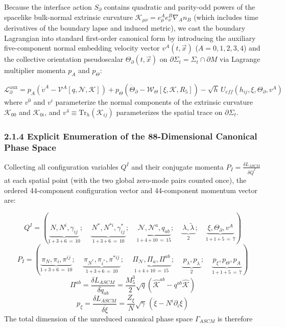 \documentclass[aps,prd,onecolumn,superscriptaddress,nofootinbib,longbibliography,10pt]{revtex4-2}
\begin{document}
{{  Because the interface action \(S_\partial\) contains quadratic and parity-odd powers of the spacelike bulk-normal extrinsic curvature \(\mathcal{K}_{\mu\nu} = e^A_\mu e^B_\nu \nabla_A n_B\) (which includes time derivatives of the boundary lapse and induced metric), we cast the boundary Lagrangian into standard first-order canonical form by introducing the auxiliary five-component normal embedding velocity vector \(v^A(t,\vec{x})\) (\(A = 0,1,2,3,4\)) and the collective orientation pseudoscalar \(\Theta_\partial(t,\vec{x})\) on \(\partial\Sigma_t = \Sigma_t \cap \partial M\) via Lagrange multiplier momenta \(p_A\) and \(p_\Theta\):


  \[ \mathcal{L}_\partial^{\text{aux}} = p_A\left(\dot{v}^A - \mathcal{V}^A[q,\mathcal{N},\mathcal{K}]\right) + p_\Theta\left(\dot{\Theta}_\partial - \mathcal{W}_\Theta[\xi,\mathcal{K},R_5]\right) - \sqrt{h}\,U_{eff}(h_{ij},\xi,\Theta_\partial,v^A) \]
  where \(v^0\) and \(v^i\) parameterize the normal components of the extrinsic curvature \(\mathcal{K}_{00}\) and \(\mathcal{K}_{0i}\), and \(v^4 \equiv \text{Tr}_h(\mathcal{K}_{ij})\) parameterizes the spatial trace on \(\partial\Sigma_t\).



  
\subsubsection*{2.1.4 Explicit Enumeration of the 88-Dimensional Canonical Phase Space}

  Collecting all configuration variables \(Q^I\) and their conjugate momenta \(P_I = \frac{\delta L_{ASCM}}{\delta\dot{Q}^I}\) at each spatial point (with the two global zero-mode pairs counted once), the ordered 44-component configuration vector and 44-component momentum vector are:


  \[ Q^I = \left( \underbrace{\,N, N^i, \gamma_{ij}\,}_{{1\,\mathbf{+}\,3\,\mathbf{+}\,6\,\mathbf{=}\,10}};\quad \underbrace{\,N^*, N^{*i}, \gamma_{ij}^*\,}_{{1\,\mathbf{+}\,3\,\mathbf{+}\,6\,\mathbf{=}\,10}};\quad \underbrace{\,\mathcal{N}, \mathcal{N}^a, q_{ab}\,}_{{1\,\mathbf{+}\,4\,\mathbf{+}\,10\,\mathbf{=}\,15}};\quad \underbrace{\,\lambda, \tilde{\lambda}\,}_{{2}};\quad \underbrace{\,\xi, \Theta_{\partial}, v^A\,}_{{1\,\mathbf{+}\,1\,\mathbf{+}\,5\,\mathbf{=}\,7}} \right) \]
  \[ P_I = \left( \underbrace{\,\pi_N, \pi_i, \pi^{ij}\,}_{{1\,\mathbf{+}\,3\,\mathbf{+}\,6\,\mathbf{=}\,10}};\quad \underbrace{\,\pi_{N^*}, \pi_{i^*}, \pi^{*ij}\,}_{{1\,\mathbf{+}\,3\,\mathbf{+}\,6\,\mathbf{=}\,10}};\quad \underbrace{\,\Pi_{\mathcal{N}}, \Pi_a, \Pi^{ab}\,}_{{1\,\mathbf{+}\,4\,\mathbf{+}\,10\,\mathbf{=}\,15}};\quad \underbrace{\,p_{\lambda}, p_{\tilde{\lambda}}\,}_{{2}};\quad \underbrace{\,p_{\xi}, p_{\Theta}, p_A\,}_{{1\,\mathbf{+}\,1\,\mathbf{+}\,5\,\mathbf{=}\,7}} \right) \]
\[\Pi^{ab} = \frac{\delta L_{ASCM}}{\delta \dot{q}_{ab}} = \frac{M_5^3}{2}\sqrt{q}\left(\widehat{\mathcal{K}}^{ab} - q^{ab}\widehat{\mathcal{K}}\right)\]
\[ p_\xi = \frac{\delta L_{ASCM}}{\delta\dot{\xi}} = \frac{Z_\xi}{N}\sqrt{\gamma}\,(\dot{\xi} - N^i\partial_i\xi) \]
  The total dimension of the unreduced canonical phase space \(\Gamma_{ASCM}\) is therefore


}}
\end{document}
